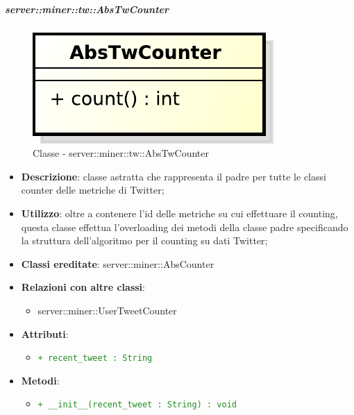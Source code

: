 	\subparagraph{server::miner::tw::AbsTwCounter} %
		\label{subp:server_miner_tw_AbsTwCounter}
		    \begin{figure}[!htbp]
 		 		\centering
 				\centerline{\includegraphics[scale=0.75]{./images/server/classes/miner/abs_tw_counter.pdf}}
 				\caption{Classe - server::miner::tw::AbsTwCounter}
			\end{figure}
			\begin{itemize}
				\item \textbf{Descrizione}: classe astratta che rappresenta il padre per tutte le classi counter delle metriche di Twitter;
				\item \textbf{Utilizzo}: oltre a contenere l’id delle metriche su cui effettuare il counting, questa classe effettua l'overloading dei metodi della classe padre specificando la struttura dell'algoritmo per il counting su dati Twitter;
				\item \textbf{Classi ereditate}: server::miner::AbsCounter
				\item \textbf{Relazioni con altre classi}:
					\begin{itemize}
						\item server::miner::UserTweetCounter
					\end{itemize}
				\item \textbf{Attributi}:
					\begin{itemize}
						\item \textcolor{forestgreen}{\texttt{+ recent\_tweet : String}}
					\end{itemize}
				\item \textbf{Metodi}: 
					\begin{itemize}
						\item \textcolor{forestgreen}{\texttt{+ \_\_init\_\_(recent\_tweet : String) : void}}
						\begin{description}

\end{description}
\end{itemize}
\end{itemize}

